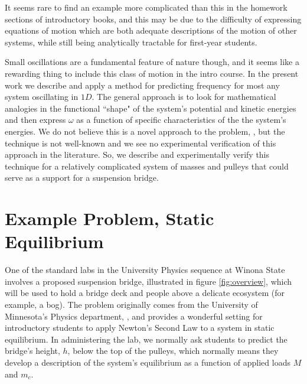 \documentclass[12pt]{iopart}
\begin{document}
It seems rare  to find an example more complicated than this in the homework sections of introductory books, and this may be due to the difficulty of expressing equations of motion which are both adequate descriptions of the motion of other systems, while still being analytically tractable for first-year students.

Small oscillations are a fundamental feature of nature though, and it seems like a rewarding thing to include this class of motion in the intro course.  In the present work we describe and apply a method for predicting frequency for most any system oscillating in $1D$.  The general approach is to look for mathematical analogies in the functional ``shape" of the system's potential and kinetic energies and then express $\omega$ as a function of specific characteristics of the the system's energies.  We do not believe this is a novel approach to the problem, \cite{bayman_hammermesh}, but the technique is not well-known and we see no experimental verification of this approach in the literature. So, we describe and experimentally verify this technique for a relatively  complicated system of masses and pulleys that could serve as a support for a suspension bridge.  

\section{Example Problem, Static Equilibrium}
One of the standard labs in the University Physics sequence at Winona State involves a proposed suspension bridge, illustrated in figure \ref{fig:overview}, which will be used to hold a bridge deck and people above a delicate ecosystem (for example, a bog).  The problem originally comes from the University of Minnesota's Physics department, \cite{UofMN_Lab_manual}, and provides a wonderful setting for introductory students to apply Newton's Second Law to a system in  static equilibrium.  In administering the lab, we normally ask students to predict the bridge's height, $h$, below the top of the pulleys, which normally means they develop a description of the system's equilibrium as a function of applied loads $M$ and $m_c$.  
\end{document}
